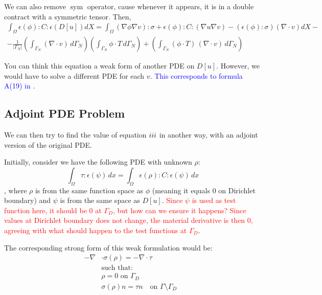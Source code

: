 \documentclass[11pt]{article}
\DeclareMathOperator{\sym}{sym}
\newcommand{\RNum}[1]{\uppercase\expandafter{\romannumeral #1\relax}}
\newcommand{\blue}{\textcolor{blue}}
\begin{document}
We can also remove $\sym$ operator, cause whenever it appears, it is in a double contract with a symmetric tensor. Then,
{\small
\begin{multline}
  \boxed{\int_{\Omega} \epsilon(\phi):C:\epsilon(D[u]) dX =
  \int_{\Omega} (\nabla \phi \nabla v):\sigma + \epsilon(\phi):C:(\nabla u \nabla v) - (\epsilon(\phi): \sigma) (\nabla \cdot v)  dX -} \\ \boxed{- \frac{1}{|\Gamma_N|} \left( \int_{\Gamma_{N}} (\nabla \cdot v) \, d\Gamma_{N} \right)  \left(\int_{\Gamma_N} \phi \cdot T\, d\Gamma_N\right) + \left(\int_{\Gamma_{N}} (\phi \cdot T) \, (\nabla \cdot v)\, d\Gamma_{N}\right)
}
  \label{eq:forwardversion}
\end{multline}
}


You can think this equation a weak form of another PDE on $D[u]$. However, we would have to solve a different PDE for each $v$. \blue{This corresponds to formula A(19) in \cite{panetta2017}}.

\subsection{Adjoint PDE Problem}
We can then try to find the value of equation $\RNum{3}$ in another way, with an adjoint version of the original PDE.

Initially, consider we have the following PDE with unknown $\rho$:
\begin{equation}
  \int_\Omega \tau:\epsilon(\psi)\, dx = \int_\Omega \epsilon(\rho):C:\epsilon(\psi) \, dx 
  \label{eq:adjointproblem}
\end{equation}
, where $\rho$ is from the same function space as $\phi$ (meaning it equals $0$ on Dirichlet boundary) and $\psi$ is from the same space as $D[u]$. \textcolor{red}{Since $\psi$ is used as test function here, it should be $0$ at $\Gamma_D$, but how can we ensure it happens? Since values at Dirichlet boundary does not change, the material derivative is then $0$, agreeing with what should happen to the test functions at $\Gamma_D$}.

The corresponding strong form of this weak formulation would be:
\begin{align*}
  - \nabla & \cdot \sigma(\rho) = - \nabla \cdot \tau \\
  &\text{such that: } \\
  &\rho =  0 \text{ on $\Gamma_D$}\\
  &\sigma(\rho) n = \tau n \quad \text{on $\Gamma \setminus \Gamma_D$ }
\end{align*}
\end{document}
